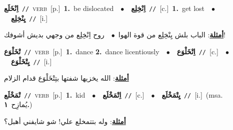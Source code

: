 \documentclass[10pt,a4paper,twoside]{article} %
\begin{document}
\begin{multicols}{2}
{\setlength\topsep{0pt}\textbf{\foreignlanguage{arabic}{اِنْخَلَع}}\ {\color{gray}\texttt{//}\color{black}}\ \textsc{verb}\ [p.]\ \textbf{1.}~be dislocated\ \ $\bullet$\ \ \setlength\topsep{0pt}\textbf{\foreignlanguage{arabic}{اِنْخِلِع}}\ {\color{gray}\texttt{//}\color{black}}\ [c.]\ \textbf{1.}~get lost\ \ $\bullet$\ \ \setlength\topsep{0pt}\textbf{\foreignlanguage{arabic}{يِنْخِلِع}}\ {\color{gray}\texttt{//}\color{black}}\ [i.]\  \begin{flushright}\color{gray}\foreignlanguage{arabic}{\textbf{\underline{\foreignlanguage{arabic}{أمثلة}}}: الباب بلش يِنْخِلِع من قوة الهوا\ $\bullet$\ \  روح اِنْخِلِع من وجهي بديش أشوفك!}\end{flushright}\color{black}} \vspace{2mm}

{\setlength\topsep{0pt}\textbf{\foreignlanguage{arabic}{تْخَلْوَع}}\ {\color{gray}\texttt{//}\color{black}}\ \textsc{verb}\ [p.]\ \textbf{1.}~dance  \textbf{2.}~dance licentiously\ \ $\bullet$\ \ \setlength\topsep{0pt}\textbf{\foreignlanguage{arabic}{اِتْخَلْوَع}}\ {\color{gray}\texttt{//}\color{black}}\ [c.]\ \ $\bullet$\ \ \setlength\topsep{0pt}\textbf{\foreignlanguage{arabic}{يِتْخَلْوَع}}\ {\color{gray}\texttt{//}\color{black}}\ [i.]\  \begin{flushright}\color{gray}\foreignlanguage{arabic}{\textbf{\underline{\foreignlanguage{arabic}{أمثلة}}}: الله يخزيها شفتها بتِتْخَلْوَع قدام الزلام}\end{flushright}\color{black}} \vspace{2mm}

{\setlength\topsep{0pt}\textbf{\foreignlanguage{arabic}{تْمَخْلَع}}\ {\color{gray}\texttt{//}\color{black}}\ \textsc{verb}\ [p.]\ \textbf{1.}~kid\ \ $\bullet$\ \ \setlength\topsep{0pt}\textbf{\foreignlanguage{arabic}{اِتْمَخْلَع}}\ {\color{gray}\texttt{//}\color{black}}\ [c.]\ \ $\bullet$\ \ \setlength\topsep{0pt}\textbf{\foreignlanguage{arabic}{يِتْمَخْلَع}}\ {\color{gray}\texttt{//}\color{black}}\ [i.]\ \color{gray}(msa. \foreignlanguage{arabic}{يُمازِح}~\foreignlanguage{arabic}{\textbf{١.}})\color{black}\  \begin{flushright}\color{gray}\foreignlanguage{arabic}{\textbf{\underline{\foreignlanguage{arabic}{أمثلة}}}: وله بتتمخلع علي! شو شايفني أهبل؟}\end{flushright}\color{black}} \vspace{2mm}


\end{multicols}
\end{document}
